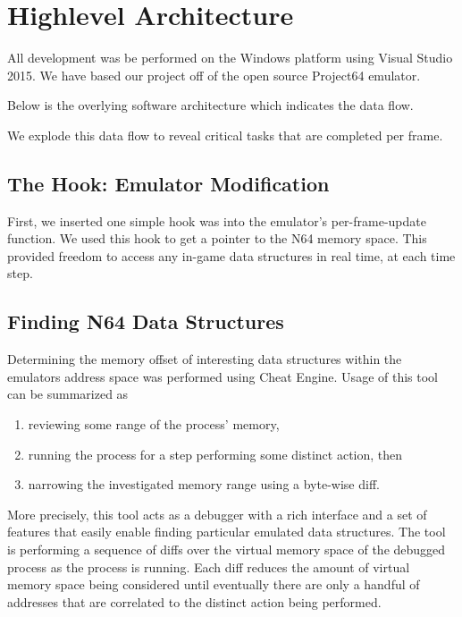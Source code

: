 \chapter*{Highlevel Architecture}

All development was be performed on the Windows platform using Visual Studio 2015.
We have based our project off of the open source Project64 emulator.

Below is the overlying software architecture which indicates the data flow.


We explode this data flow to reveal critical tasks that are completed per frame.



\section*{The Hook: Emulator Modification}
First, we inserted one simple hook was into the emulator's per-frame-update function. 
We used this hook to get a pointer to the N64 memory space. 
This provided freedom to access any in-game data structures in real time, at each time step. 

\section*{Finding N64 Data Structures}
Determining the memory offset of interesting data structures within the emulators address space was performed using Cheat Engine.
Usage of this tool can be summarized as 
\begin{enumerate}
\item reviewing some range of the process' memory,
\item  running the process for a step performing some distinct action, then
\item narrowing the investigated memory range using a byte-wise diff.
\end{enumerate}

More precisely, this tool acts as a debugger with a rich interface and a set of features that easily enable finding particular emulated data structures.
The tool is performing a sequence of diffs over the virtual memory space of the debugged process as the process is running.
Each diff reduces the amount of virtual memory space being considered until eventually there are only a handful of addresses that are correlated to the distinct action being performed.

